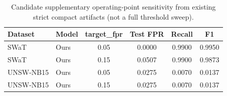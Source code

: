 \begin{table}[t]
  \centering
  \caption{Candidate supplementary operating-point sensitivity from existing strict compact artifacts (not a full threshold sweep).}
  \label{tab:candidate_supp_operating_points}
  \small
  \begin{tabular}{llcccc}
    \toprule
    Dataset & Model & target\_fpr & Test FPR & Recall & F1 \\
    \midrule
    SWaT & Ours & 0.05 & 0.0000 & 0.9900 & 0.9950 \\
    SWaT & Ours & 0.15 & 0.0507 & 0.9900 & 0.9873 \\
    UNSW-NB15 & Ours & 0.05 & 0.0275 & 0.0070 & 0.0137 \\
    UNSW-NB15 & Ours & 0.15 & 0.0275 & 0.0070 & 0.0137 \\
    \bottomrule
  \end{tabular}
\end{table}
